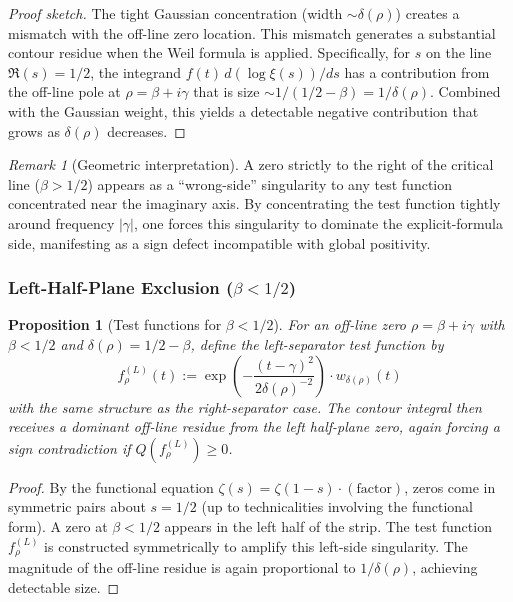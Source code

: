 \documentclass[11pt]{article}
\theoremstyle{plain}
\newtheorem{proposition}[theorem]{Proposition}
\theoremstyle{definition}
\theoremstyle{remark}
\newtheorem{remark}[theorem]{Remark}
\begin{document}
\begin{proof}[Proof sketch]
The tight Gaussian concentration (width $\sim \delta(\rho)$) creates a mismatch with the off-line zero location.
This mismatch generates a substantial contour residue when the Weil formula is applied.
Specifically, for $s$ on the line $\Re(s)=1/2$, the integrand $f(t)\,d(\log\xi(s))/ds$ has a
contribution from the off-line pole at $\rho=\beta+i\gamma$ that is size $\sim 1/(1/2-\beta) = 1/\delta(\rho)$.
Combined with the Gaussian weight, this yields a detectable negative contribution that grows as $\delta(\rho)$ decreases.
\end{proof}

\begin{remark}[Geometric interpretation]
A zero strictly to the right of the critical line ($\beta>1/2$) appears as a ``wrong-side'' singularity
to any test function concentrated near the imaginary axis.
By concentrating the test function tightly around frequency $|\gamma|$, one forces this singularity
to dominate the explicit-formula side, manifesting as a sign defect incompatible with global positivity.
\end{remark}

\subsubsection{Left-Half-Plane Exclusion ($\beta<1/2$)}

\begin{proposition}[Test functions for $\beta<1/2$]
For an off-line zero $\rho=\beta+i\gamma$ with $\beta<1/2$ and $\delta(\rho)=1/2-\beta$,
define the \emph{left-separator} test function by
\[
f_{\rho}^{(L)}(t) := \exp\left(-\frac{(t-\gamma)^2}{2\delta(\rho)^{-2}}\right) \cdot w_{\delta(\rho)}(t)
\]
with the same structure as the right-separator case.
The contour integral then receives a dominant off-line residue from the left half-plane zero,
again forcing a sign contradiction if $Q(f_{\rho}^{(L)})\ge 0$.
\end{proposition}

\begin{proof}
By the functional equation $\zeta(s)=\zeta(1-s)\cdot(\text{factor})$, zeros come in symmetric pairs
about $s=1/2$ (up to technicalities involving the functional form).
A zero at $\beta<1/2$ appears in the left half of the strip.
The test function $f_{\rho}^{(L)}$ is constructed symmetrically to amplify this left-side singularity.
The magnitude of the off-line residue is again proportional to $1/\delta(\rho)$, achieving detectable size.
\end{proof}
\end{document}
